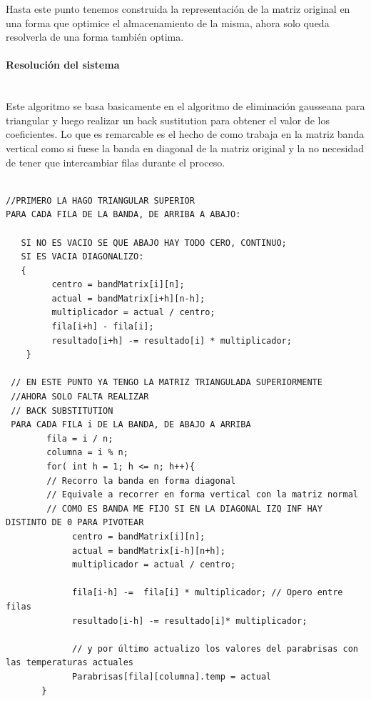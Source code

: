 Hasta este punto tenemos construida la representación de la matriz original en una forma que optimice el almacenamiento de la misma, ahora solo queda resolverla de una forma también optima.

\paragraph{Resolución del sistema} \mbox{}\\

Este algoritmo se basa basicamente en el algoritmo de eliminación gausseana para triangular y luego realizar un back sustitution para obtener el valor de los coeficientes.
Lo que es remarcable es el hecho de como trabaja en la matriz banda vertical como si fuese la banda en diagonal de la matriz original y la no necesidad de tener que intercambiar filas durante el proceso.
 
\begin{verbatim}

//PRIMERO LA HAGO TRIANGULAR SUPERIOR
PARA CADA FILA DE LA BANDA, DE ARRIBA A ABAJO:
		
   SI NO ES VACIO SE QUE ABAJO HAY TODO CERO, CONTINUO;
   SI ES VACIA DIAGONALIZO:
   {
         centro = bandMatrix[i][n];
         actual = bandMatrix[i+h][n-h];
         multiplicador = actual / centro;		
         fila[i+h] - fila[i];
         resultado[i+h] -= resultado[i] * multiplicador;
    }
   
 // EN ESTE PUNTO YA TENGO LA MATRIZ TRIANGULADA SUPERIORMENTE
 //AHORA SOLO FALTA REALIZAR
 // BACK SUBSTITUTION
 PARA CADA FILA i DE LA BANDA, DE ABAJO A ARRIBA
        fila = i / n;
        columna = i % n;
        for( int h = 1; h <= n; h++){ 
        // Recorro la banda en forma diagonal
        // Equivale a recorrer en forma vertical con la matriz normal
        // COMO ES BANDA ME FIJO SI EN LA DIAGONAL IZQ INF HAY DISTINTO DE 0 PARA PIVOTEAR
             centro = bandMatrix[i][n];
             actual = bandMatrix[i-h][n+h];           
             multiplicador = actual / centro;
		
             fila[i-h] -=  fila[i] * multiplicador; // Opero entre filas
             resultado[i-h] -= resultado[i]* multiplicador; 
                
             // y por último actualizo los valores del parabrisas con las temperaturas actuales             
             Parabrisas[fila][columna].temp = actual
       }
\end{verbatim}





